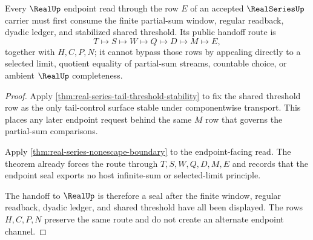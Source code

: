 \begin{theorem}\label{thm:real-series-endpoint-nonescape-obligation}
Every $\RealUp$ endpoint read through the row $E$ of an accepted $\RealSeriesUp$ carrier must first consume the finite partial-sum window, regular readback, dyadic ledger, and stabilized shared threshold. Its public handoff route is
$$
T\longmapsto S\longmapsto W\longmapsto Q\longmapsto D\longmapsto M\longmapsto E,
$$
together with $H,C,P,N$; it cannot bypass those rows by appealing directly to a selected limit, quotient equality of partial-sum streams, countable choice, or ambient $\RealUp$ completeness.
\end{theorem}
\begin{proof}
Apply \autoref{thm:real-series-tail-threshold-stability} to fix the shared threshold row as the only tail-control surface stable under componentwise transport. This places any later endpoint request behind the same $M$ row that governs the partial-sum comparisons.

Apply \autoref{thm:real-series-nonescape-boundary} to the endpoint-facing read. The theorem already forces the route through $T,S,W,Q,D,M,E$ and records that the endpoint seal exports no host infinite-sum or selected-limit principle.

The handoff to $\RealUp$ is therefore a seal after the finite window, regular readback, dyadic ledger, and shared threshold have all been displayed. The rows $H,C,P,N$ preserve the same route and do not create an alternate endpoint channel.
\end{proof}

